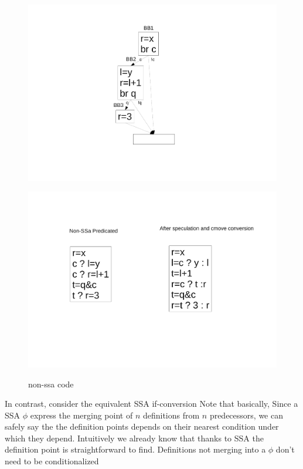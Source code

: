 \begin{figure}
\footnotesize
\begin{minipage}[b]{4cm}
\includegraphics[scale=0.2]{nested_0.pdf}
\label{fig:nest0}
\end{minipage}
\begin{minipage}[b]{4cm}
\includegraphics[scale=0.2]{nested_01.pdf}
\label{fig:nest0}
\end{minipage}
\caption{non-ssa code}
\end{figure}

In contrast, consider the equivalent SSA if-conversion 
Note that basically, Since a SSA $\phi$ express the merging point of $n$ definitions from $n$ predecessors, we can safely say the the definition points depends on their nearest condition under which they depend. Intuitively we already know that thanks to SSA the definition point is straightforward to find. Definitions not merging into a $\phi$ don't need to be conditionalized

